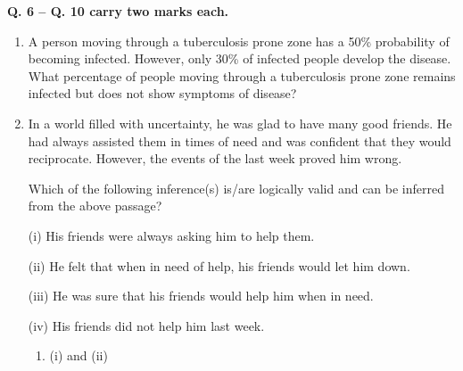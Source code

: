 \documentclass[journal,11pt,onecolumn]{IEEEtran}
\begin{document}
\normalsize\textbf{Q. 6 – Q. 10 carry two marks each.}\\

\begin{enumerate}[resume]

    \item A person moving through a tuberculosis prone zone has a 50\% probability of becoming infected. However, only 30\% of infected people develop the disease. What percentage of people moving through a tuberculosis prone zone remains infected but does not show symptoms of disease?

          \begin{enumerate}


          \end{enumerate}

    \item In a world filled with uncertainty, he was glad to have many good friends. He had always assisted them in times of need and was confident that they would reciprocate. However, the events of the last week proved him wrong.

          Which of the following inference(s) is/are logically valid and can be inferred from the above passage?

          (i) His friends were always asking him to help them.

          (ii) He felt that when in need of help, his friends would let him down.

          (iii) He was sure that his friends would help him when in need.

          (iv) His friends did not help him last week.

          \begin{enumerate}

              \item (i) and (ii)


\end{enumerate}
\end{enumerate}
\end{document}

